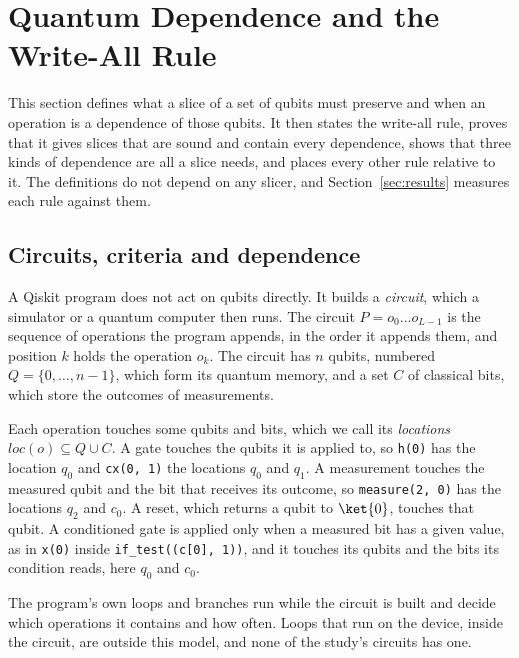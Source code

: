 \section{Quantum Dependence and the Write-All Rule}\label{sec:core}

This section defines what a slice of a set of qubits must preserve and when an operation is a dependence of
those qubits. It then states the write-all rule, proves that it gives slices that are sound and contain every
dependence, shows that three kinds of dependence are all a slice needs, and places every other rule relative to
it. The definitions do not depend on any slicer, and Section~\ref{sec:results} measures each rule against them.

\subsection{Circuits, criteria and dependence}
A Qiskit program does not act on qubits directly. It builds a \emph{circuit}, which a simulator or a quantum
computer then runs. The circuit $P = o_0 \dots o_{L-1}$ is the sequence of operations the program appends, in the
order it appends them, and position $k$ holds the operation $o_k$. The circuit has $n$ qubits, numbered
$Q = \{0, \dots, n-1\}$, which form its quantum memory, and a set $C$ of classical bits, which store the outcomes of
measurements.

Each operation touches some qubits and bits, which we call its \emph{locations} $\mathit{loc}(o) \subseteq Q \cup
C$. A gate touches the qubits it is applied to, so \texttt{h(0)} has the location $q_0$ and \texttt{cx(0, 1)} the
locations $q_0$ and $q_1$. A measurement touches the measured qubit and the bit that receives its outcome, so
\texttt{measure(2, 0)} has the locations $q_2$ and $c_0$. A reset, which returns a qubit to $\ket{0}$, touches that
qubit. A conditioned gate is applied only when a measured bit has a given value, as in \texttt{x(0)} inside
\texttt{if\_test((c[0], 1))}, and it touches its qubits and the bits its condition reads, here $q_0$ and $c_0$.

The program's own loops and branches run while the circuit is built and decide which operations it contains and
how often. Loops that run on the device, inside the circuit, are outside this model, and none of the study's circuits
has one.

